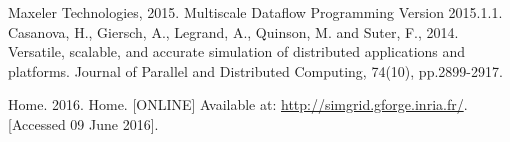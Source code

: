 \documentclass[a4paper,11pt]{article}
\begin{document}
\begin{thebibliography}{9}

Maxeler Technologies, 2015. Multiscale Dataflow Programming Version 2015.1.1.
Casanova, H., Giersch, A., Legrand, A., Quinson, M. and Suter, F., 2014. Versatile, scalable, and accurate simulation of distributed applications and platforms. Journal of Parallel and Distributed Computing, 74(10), pp.2899-2917.

Home. 2016. Home. [ONLINE] Available at: \url{http://simgrid.gforge.inria.fr/}. [Accessed 09 June 2016].
\end{thebibliography}
\end{document}
